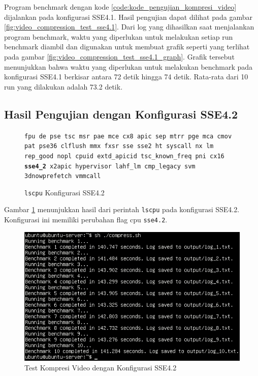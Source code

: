 Program benchmark dengan kode \ref{code:kode_pengujian_kompresi_video} dijalankan pada konfigurasi SSE4.1. Hasil pengujian dapat dilihat pada gambar \ref{fig:video_compression_test_sse4.1}. Dari log yang dihasilkan saat menjalankan program benchmark, waktu yang diperlukan untuk melakukan setiap run benchmark diambil dan digunakan untuk membuat grafik seperti yang terlihat pada gambar \ref{fig:video_compression_test_sse4.1_graph}. Grafik tersebut menunjukkan bahwa waktu yang diperlukan untuk melakukan benchmark pada konfigurasi SSE4.1 berkisar antara 72 detik hingga 74 detik. Rata-rata dari 10 run yang dilakukan adalah 73.2 detik.

\subsection{Hasil Pengujian dengan Konfigurasi SSE4.2}
\begin{figure}
    \texttt{fpu de pse tsc msr pae mce cx8 apic sep mtrr pge mca cmov pat pse36 clflush mmx fxsr sse sse2 ht syscall nx lm rep\_good nopl cpuid extd\_apicid tsc\_known\_freq pni cx16 \textbf{sse4\_2} x2apic hypervisor lahf\_lm cmp\_legacy svm 3dnowprefetch vmmcall}
    \caption{\texttt{lscpu} Konfigurasi SSE4.2}
    \label{fig:lscpu_video_compression_test_sse4.2}
\end{figure}

Gambar \ref{fig:lscpu_video_compression_test_sse4.2} menunjukkan hasil dari perintah \texttt{lscpu} pada konfigurasi SSE4.2. Konfigurasi ini memiliki perubahan flag cpu \texttt{sse4.2}.

\begin{figure}
    \centering
    \includegraphics[width=1\textwidth]
    {assets/pics/video-compression-test/sse4.2.jpeg}
    \caption{Test Kompresi Video dengan Konfigurasi SSE4.2}
    \label{fig:video_compression_test_sse4.2}
\end{figure}


